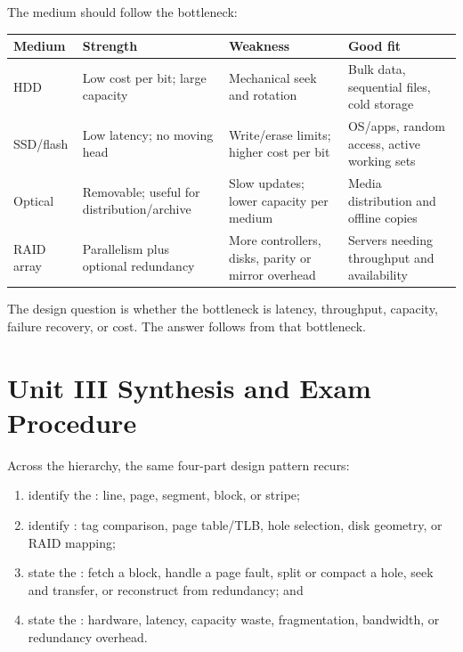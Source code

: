 \documentclass[11pt]{article}
\begin{document}
The medium should follow the bottleneck:
\begin{center}
\footnotesize
\begin{tabular}{@{}>{\raggedright\arraybackslash}p{2.3cm}>{\raggedright\arraybackslash}p{3.0cm}>{\raggedright\arraybackslash}p{3.0cm}>{\raggedright\arraybackslash}p{3.9cm}@{}}
\toprule
\textbf{Medium} & \textbf{Strength} & \textbf{Weakness} & \textbf{Good fit} \\
\midrule
HDD & Low cost per bit; large capacity & Mechanical seek and rotation & Bulk data, sequential files, cold storage \\
SSD/flash & Low latency; no moving head & Write/erase limits; higher cost per bit & OS/apps, random access, active working sets \\
Optical & Removable; useful for distribution/archive & Slow updates; lower capacity per medium & Media distribution and offline copies \\
RAID array & Parallelism plus optional redundancy & More controllers, disks, parity or mirror overhead & Servers needing throughput and availability \\
\bottomrule
\end{tabular}
\end{center}

The design question is whether the bottleneck is latency, throughput, capacity,
failure recovery, or cost. The answer follows from that bottleneck.

\section{Unit III Synthesis and Exam Procedure}
\label{sec:synthesis}

Across the hierarchy, the same four-part design pattern recurs:
\begin{enumerate}
  \item identify the : line, page, segment, block, or stripe;
  \item identify : tag comparison, page table/TLB,
        hole selection, disk geometry, or RAID mapping;
  \item state the : fetch a block, handle a page
        fault, split or compact a hole, seek and transfer, or reconstruct from
        redundancy; and
  \item state the : hardware, latency, capacity waste,
        fragmentation, bandwidth, or redundancy overhead.
\end{enumerate}
\end{document}
